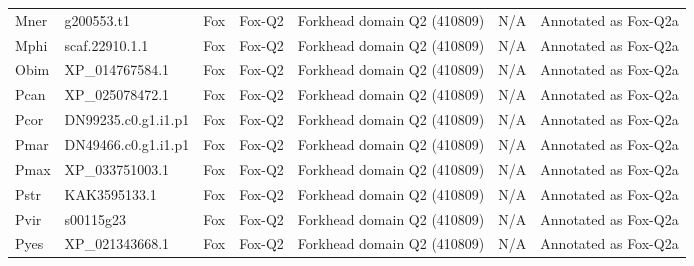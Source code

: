 \documentclass[../main.tex]{subfiles}
\begin{document}
\begin{landscape}
\begin{longtable}{lllllll}
		Mner           & g200553.t1            & Fox            & Fox-Q2              & Forkhead domain Q2 (410809)                 & N/A                                                                    & Annotated as Fox-Q2a \\
		Mphi           & scaf.22910.1.1        & Fox            & Fox-Q2              & Forkhead domain Q2 (410809)                 & N/A                                                                    & Annotated as Fox-Q2a \\
		Obim           & XP\_014767584.1       & Fox            & Fox-Q2              & Forkhead domain Q2 (410809)                 & N/A                                                                    & Annotated as Fox-Q2a \\
		Pcan           & XP\_025078472.1       & Fox            & Fox-Q2              & Forkhead domain Q2 (410809)                 & N/A                                                                    & Annotated as Fox-Q2a \\
		Pcor           & DN99235.c0.g1.i1.p1   & Fox            & Fox-Q2              & Forkhead domain Q2 (410809)                 & N/A                                                                    & Annotated as Fox-Q2a \\
		Pmar           & DN49466.c0.g1.i1.p1   & Fox            & Fox-Q2              & Forkhead domain Q2 (410809)                 & N/A                                                                    & Annotated as Fox-Q2a \\
		Pmax           & XP\_033751003.1       & Fox            & Fox-Q2              & Forkhead domain Q2 (410809)                 & N/A                                                                    & Annotated as Fox-Q2a \\
		Pstr           & KAK3595133.1          & Fox            & Fox-Q2              & Forkhead domain Q2 (410809)                 & N/A                                                                    & Annotated as Fox-Q2a \\
		Pvir           & s00115g23             & Fox            & Fox-Q2              & Forkhead domain Q2 (410809)                 & N/A                                                                    & Annotated as Fox-Q2a \\
		Pyes           & XP\_021343668.1       & Fox            & Fox-Q2              & Forkhead domain Q2 (410809)                 & N/A                                                                    & Annotated as Fox-Q2a \\

\end{longtable}
\end{landscape}
\end{document}
